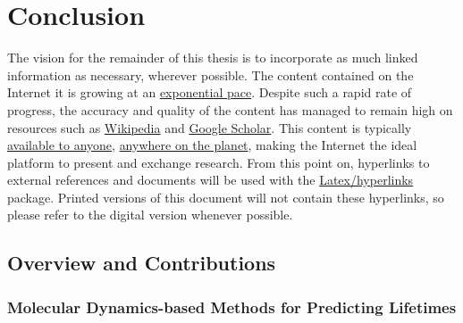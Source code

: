\chapter{\label{Conclusion}Conclusion}

The vision for the remainder of this thesis is to incorporate 
as much linked information as necessary, wherever possible. 
The content contained on the Internet it is growing at an 
\href{http://www.huffingtonpost.com/brett-king/too-much-content-a-world-_b_809677.html}
{exponential pace}. 
Despite such a rapid rate of progress, the accuracy and quality of 
the content has managed to remain high on resources such as 
\href{http://en.wikipedia.org/wiki/Reliability_of_Wikipedia}{Wikipedia} and 
\href{http://en.wikipedia.org/wiki/Google_Scholar}{Google Scholar}. 
This content is typically 
\href{http://en.wikipedia.org/wiki/Internet_censorship_in_the_People's_Republic_of_China}
{available to anyone}, 
\href{http://en.wikipedia.org/wiki/Global_Internet_usage}{anywhere on the planet}, 
making the Internet the ideal platform to present and exchange research. 
From this point on, hyperlinks to external references and documents will be 
used with the 
\href{http://en.wikibooks.org/wiki/LaTeX/Hyperlinks}{Latex/hyperlinks} 
package. Printed versions of this document will not contain these 
hyperlinks, so please refer to the digital version whenever possible. 

\section{\label{Overview}Overview and Contributions}

\subsection{\label{Overview:SED} 
Molecular Dynamics-based Methods for Predicting Lifetimes}

